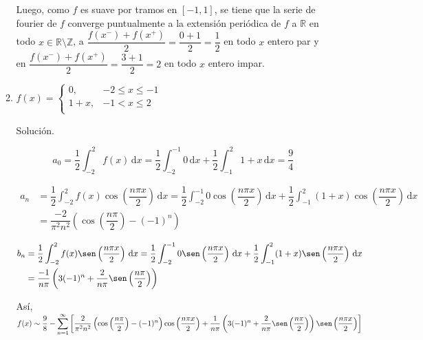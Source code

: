\documentclass[fleqn]{article}
\newcommand{\real}{\mathbb{R}}
\newcommand{\ent}{\mathbb{Z}}
\newcommand{\intg}[3]{\int_{#1}^{#2} #3 \, \mathrm{d}x}
\begin{document}
\begin{enumerate}[I.]
\begin{enumerate}[(1)]
			Luego, como $f$ es suave por tramos en $ [-1,1] $, se tiene que la serie de fourier de $f$ converge puntualmente a la extensión periódica de $f$ a $ \real $ en todo $ x \in \real \setminus \ent $, a $ \dfrac{f(x^-) + f(x^+)}{2} = \dfrac{0+1}{2} = \dfrac{1}{2} $ en todo $ x $ entero par y en $ \dfrac{f(x^-) + f(x^+)}{2} = \dfrac{3+1}{2} = 2 $ en todo $ x $ entero impar.


			\bfseries
			\item $ f(x) = \begin{cases}
				0, & -2 \leq x \leq -1 \\
				1 + x, & -1 < x \leq 2 \\
			\end{cases} $
			
			Solución.

			\normalfont

			\begin{equation*}
				a_0 = \dfrac{1}{2} \intg{-2}{2}{f(x)} = \dfrac{1}{2} \intg{-2}{-1}{0} + \dfrac{1}{2} \intg{-1}{2}{1 + x} = \dfrac{9}{4}
			\end{equation*}

			\begin{align*}
				a_n &= \dfrac{1}{2} \intg{-2}{2}{f(x) \cos \left( \dfrac{n \pi x}{2} \right)} = \dfrac{1}{2} \intg{-2}{-1}{0 \cos \left( \dfrac{n \pi x}{2} \right)} + \dfrac{1}{2} \intg{-1}{2}{(1 + x) \cos \left( \dfrac{n \pi x}{2} \right)} \\
				&= \dfrac{-2}{\pi^2 n^2} \left( \cos \left( \dfrac{n \pi}{2} \right) - (-1)^n \right)
			\end{align*}

			\begin{align*}
				b_n &= \dfrac{1}{2} \intg{-2}{2}{f(x) \sen \left( \dfrac{n \pi x}{2} \right)} = \dfrac{1}{2} \intg{-2}{-1}{0 \sen \left( \dfrac{n \pi x}{2} \right)} + \dfrac{1}{2} \intg{-1}{2}{(1 + x) \sen \left( \dfrac{n \pi x}{2} \right)} \\
				&= \dfrac{-1}{n \pi} \left( 3(-1)^n + \dfrac{2}{n \pi} \sen \left( \dfrac{n \pi}{2} \right) \right)
			\end{align*}

			Así, $ \displaystyle f(x) \sim \dfrac{9}{8} - \sum_{n=1}^{\infty} \left[ \dfrac{2}{\pi^2 n^2} \left( \cos \left( \dfrac{n \pi}{2} \right) - (-1)^n \right) \cos \left( \dfrac{n \pi x}{2} \right) + \dfrac{1}{n \pi} \left( 3(-1)^n + \dfrac{2}{n \pi} \sen \left( \dfrac{n \pi}{2} \right) \right) \sen \left( \dfrac{n \pi x}{2} \right) \right] $


\end{enumerate}
\end{enumerate}
\end{document}
